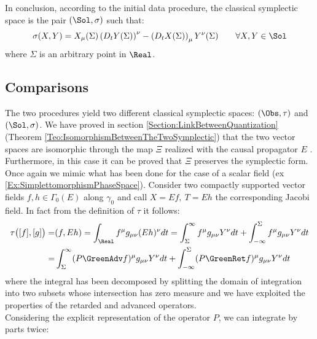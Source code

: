 \documentclass[Main]{subfiles}
\begin{document}
				\vspace{3.5mm}
				In conclusion, according to the initial data procedure,  the classical symplectic space is the pair $(\Sol, \sigma)$ such that:
				\begin{displaymath}
					\sigma( X, Y) = X_\mu(\Sigma) \left( D_t Y (\Sigma)\right)^\nu - \left(D_t X(\Sigma)\right)_\mu Y^\nu(\Sigma) \qquad \forall X,Y \in \Sol
				\end{displaymath}
				where $\Sigma$ is an arbitrary point in $\Real$.

	\subsection{Comparisons}
		The two procedures yield two different classical symplectic spaces: $(\Obs,\tau)$ and $(\Sol, \sigma)$.
		We have proved in section \ref{Section:LinkBetweenQuantization} (Theorem \ref{Teo:IsomorphismBetweenTheTwoSymplectic}) that the two vector spaces are isomorphic through the map $\Xi$ realized with the causal propagator $E$ .
		Furthermore, in this case it can be proved that $\Xi$ preserves the symplectic form.
		\\
		Once again we mimic what has been done for the case of a scalar field (ex \ref{Ex:SimplettomorphismPhaseSpace}).
		Consider two compactly supported vector fields $f,h \in \Gamma_0(E)$ along $\gamma_0$	and call $X= Ef,\: T = Eh$ the corresponding Jacobi field.
		In fact from the definition of $\tau$ it follows:
		\begin{align}
			\tau\big( [f], [g] \big) =& (f, Eh) = \int_\Real f^\mu g_{\mu \nu} ( E h)^\nu dt =
					\int_\Sigma^\infty  f^\mu g_{\mu \nu} Y^\nu dt	 + 
					\int_{-\infty}^\Sigma  f^\mu g_{\mu \nu} Y^\nu dt
			\nonumber \\
			=& \int_\Sigma^\infty (P \GreenAdv f)^\mu g_{\mu \nu} Y^\nu dt	 + 
					\int_{-\infty}^\Sigma (P \GreenRet f)^\mu g_{\mu \nu} Y^\nu dt
		\end{align}
		where the integral has been decomposed by splitting the domain of integration into two subsets whose intersection has zero measure and we have exploited the properties of the retarded and advanced operators.\\
		Considering the explicit representation of the operator $P$, we can integrate by parts twice:
\end{document}
